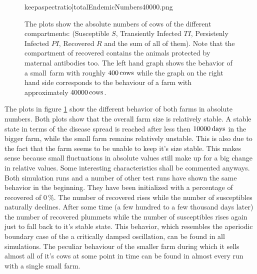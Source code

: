 \begin{figure}[htbp]
\begin{minipage}{0.5\textwidth}
keepaspectratio]{totalEndemicNumbers40000.png} 
\end{minipage}
\caption[Absolute Numbers Of Compartments In Different Farm Sizes]{The plots show the absolute numbers of cows of the different compartments: (Susceptible $S$, Transiently Infected $TI$, Persistenly Infected $PI$, Recovered $R$ and the sum of all of them). Note that the compartment of recovered contains the animals protected by maternal antibodies too\protect\footnotemark. The left hand graph shows the behavior of a \glqq small\grqq\ farm with roughly $400\,\text{cows}$ while the graph on the right hand side corresponds to the behaviour of a farm with approximately $40000\,\text{cows}$.}
\label{fig:absoluteNumbersCompartmentsDifferentFarmSizes}
\end{figure} 
The plots in figure \ref{fig:absoluteNumbersCompartmentsDifferentFarmSizes} show the different behavior of both farms in absolute numbers. Both plots show that the overall farm size is relatively stable. A stable state in terms of the disease spread is reached after less then $10000\,\text{days}$ in the bigger farm, while the small farm remains relatively unstable. This is also due to the fact that the farm seems to be unable to keep it's size stable. This makes sense because small fluctuations in absolute values still make up for a big change in relative values. Some interesting characteristics shall be commented anyways. Both simulation runs and a number of other test runs have shown the same behavior in the beginning. They have been initialized with a percentage of recovered of $0\,\%$. The number of recovered rises while the number of susceptibles naturally declines. After some time (a few hundred to a few thousand days later) the number of recovered plummets while the number of susceptibles rises again just to fall back to it's stable state. This behavior, which resembles the aperiodic boundary case of the a critically damped oscillation, can be found in all simulations. The peculiar behaviour of the smaller farm during which it sells almost all of it's cows at some point in time can be found in almost every run with a single small farm. 

